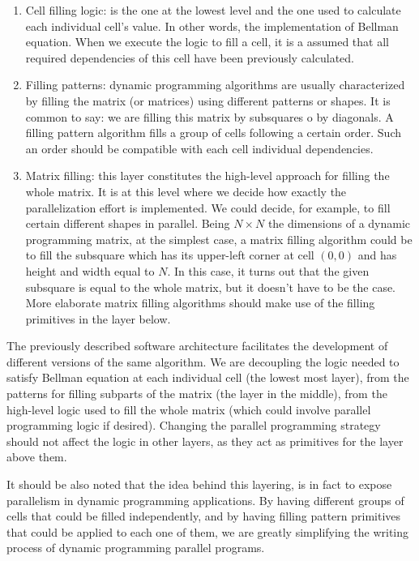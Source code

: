\documentclass[journal]{IEEEtran}
\begin{document}
\begin{enumerate}
    \item Cell filling logic: is the one at the lowest level and the one used to calculate each individual cell's value. In other words, the implementation of Bellman equation. When we execute the logic to fill a cell, it is a assumed that all required dependencies of this cell have been previously calculated.
    \item Filling patterns: dynamic programming algorithms are usually characterized by filling the matrix (or matrices) using different patterns or shapes. It is common to say: we are filling this matrix by subsquares o by diagonals. A filling pattern algorithm fills a group of cells following a certain order. Such an order should be compatible with each cell individual dependencies.
    \item Matrix filling: this layer constitutes the high-level approach for filling the whole matrix. It is at this level where we decide how exactly the parallelization effort is implemented. We could decide, for example, to fill certain different shapes in parallel. Being $N \times N$ the dimensions of a dynamic programming matrix, at the simplest case, a matrix filling algorithm could be to fill the subsquare which has its upper-left corner at cell $(0,0)$ and has height and width equal to $N$. In this case, it turns out that the given subsquare is equal to the whole matrix, but it doesn't have to be the case. More elaborate matrix filling algorithms should make use of the filling primitives in the layer below. 
\end{enumerate}

The previously described software architecture facilitates the development of different versions of the same algorithm. We are decoupling the logic needed to satisfy Bellman equation at each individual cell (the lowest most layer), from the patterns for filling subparts of the matrix (the layer in the middle), from the high-level logic used to fill the whole matrix (which could involve parallel programming logic if desired). Changing the parallel programming strategy should not affect the logic in other layers, as they act as primitives for the layer above them.

It should be also noted that the idea behind this layering, is in fact to expose parallelism in dynamic programming applications. By having different groups of cells that could be filled independently, and by having filling pattern primitives that could be applied to each one of them, we are greatly simplifying the writing process of dynamic programming parallel programs.
\end{document}
